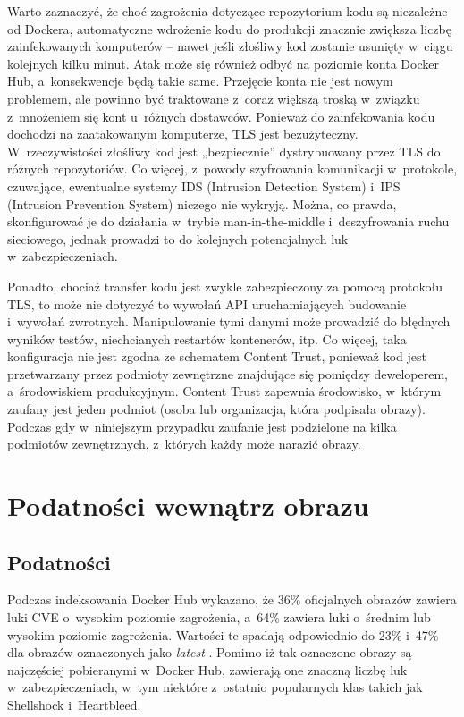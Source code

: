 Warto zaznaczyć, że choć zagrożenia dotyczące repozytorium kodu są niezależne od Dockera, automatyczne wdrożenie kodu do produkcji znacznie zwiększa liczbę zainfekowanych komputerów -- nawet jeśli złośliwy kod zostanie usunięty w~ciągu kolejnych kilku minut. Atak może się również odbyć na poziomie konta Docker Hub, a~konsekwencje będą takie same. Przejęcie konta nie jest nowym problemem, ale powinno być traktowane z~coraz większą troską w~związku z~mnożeniem się kont u~różnych dostawców. Ponieważ do zainfekowania kodu dochodzi na zaatakowanym komputerze, TLS jest bezużyteczny. W~rzeczywistości złośliwy kod jest „bezpiecznie” dystrybuowany przez TLS do różnych repozytoriów. Co więcej, z~powody szyfrowania komunikacji w~protokole, czuwające, ewentualne systemy IDS (Intrusion Detection System) i~IPS (Intrusion Prevention System) niczego nie wykryją. Można, co prawda, skonfigurować je do działania w~trybie man-in-the-middle i~deszyfrowania ruchu sieciowego, jednak prowadzi to do kolejnych potencjalnych luk w~zabezpieczeniach.

Ponadto, chociaż transfer kodu jest zwykle zabezpieczony za pomocą protokołu TLS, to może nie dotyczyć to wywołań API uruchamiających budowanie i~wywołań zwrotnych. Manipulowanie tymi danymi może prowadzić do błędnych wyników testów, niechcianych restartów kontenerów, itp. Co więcej, taka konfiguracja nie jest zgodna ze schematem Content Trust, ponieważ kod jest przetwarzany przez podmioty zewnętrzne znajdujące się pomiędzy deweloperem, a~środowiskiem produkcyjnym. Content Trust zapewnia środowisko, w~którym zaufany jest jeden podmiot (osoba lub organizacja, która podpisała obrazy). Podczas gdy w~niniejszym przypadku zaufanie jest podzielone na kilka podmiotów zewnętrznych, z~których każdy może narazić obrazy.

\section{Podatności wewnątrz obrazu}

\subsection{Podatności}

Podczas indeksowania Docker Hub wykazano, że 36\% oficjalnych obrazów zawiera luki CVE o~wysokim poziomie zagrożenia, a~64\% zawiera luki o~średnim lub wysokim poziomie zagrożenia. Wartości te spadają odpowiednio do 23\% i~47\% dla obrazów oznaczonych jako \textit{latest} \cite{BanyanDockerHubHighPrioritySecurityVulnerabilities}. Pomimo iż tak oznaczone obrazy są najczęściej pobieranymi w~Docker Hub, zawierają one znaczną liczbę luk w~zabezpieczeniach, w~tym niektóre z~ostatnio popularnych klas takich jak Shellshock i~Heartbleed.

